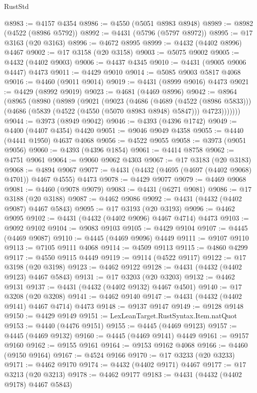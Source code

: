 \begin{lexlean}{RustStd}
\begin{coremodule}
@8983 := @4157 @4354
@8986 := @4550 (@5051 @8983 @8948)
@8989 := @8982 (@4522 (@8986 @5792))
@8992 := @4431 (@5796 (@5797 @8972))
@8995 := @17 @3163 (@20 @3163)
@8996 := @4672 @8995
@8999 := @4432 (@4402 @8996) @4467
@9002 := @17 @3158 (@20 @3158)
@9003 := @5075 @9002
@9005 := @4432 (@4402 @9003)
@9006 := @4437 @4345
@9010 := @4431 (@9005 @9006 @4447) @4473
@9011 := @4429 @9010
@9014 := @5085 @9003 @5817 @4068
@9016 := @4460 (@9011 @9014)
@9019 := @4431 (@8999 @9016) @4473
@9021 := @4429 (@8992 @9019)
@9023 := @4681 (@4469 @8996)
@9042 := @8964
    (@8965
      (@8980
        (@8989
          (@9021
            (@9023
              (@4686
                (@4689 (@4522 (@8986 @5833)))
                (@4686 (@5839 (@4522 (@4550 (@5070 @8983 @8948) @5847))) @4723)))))))
@9044 := @3973 (@8949 @9042)
@9046 := @4393 (@4396 @1742)
@9049 := @4400 (@4407 @4354) @4420
@9051 := @9046 @9049 @4358
@9055 := @4440 (@4441 @1950) @4637 @4068
@9056 := @4522 @9055
@9058 := @3973 (@9051 @9056)
@9060 := @4393 (@4396 @1854)
@9061 := @4414 @8758
@9062 := @4751 @9061
@9064 := @9060 @9062 @4303
@9067 := @17 @3183 (@20 @3183)
@9068 := @4894 @9067
@9077 := @4431 (@4432 (@4695 (@4697 (@4402 @9068) @4701)) @4467 @4555) @4473
@9078 := @4429 @9077
@9079 := @4469 @9068
@9081 := @4460 (@9078 @9079)
@9083 := @4431 (@6271 @9081)
@9086 := @17 @3188 (@20 @3188)
@9087 := @4462 @9086
@9092 := @4431 (@4432 (@4402 @9087) @4467 @5843)
@9095 := @17 @3193 (@20 @3193)
@9096 := @4462 @9095
@9102 := @4431 (@4432 (@4402 @9096) @4467 @4714) @4473
@9103 := @9092 @9102
@9104 := @9083 @9103
@9105 := @4429 @9104
@9107 := @4445 (@4469 @9087)
@9110 := @4445 (@4469 @9096) @4449
@9111 := @9107 @9110
@9113 := @7105 @9111 @4068
@9114 := @4509 @9113
@9115 := @4860 @4299
@9117 := @4550 @9115 @4449
@9119 := @9114 (@4522 @9117)
@9122 := @17 @3198 (@20 @3198)
@9123 := @4462 @9122
@9128 := @4431 (@4432 (@4402 @9123) @4467 @5843)
@9131 := @17 @3203 (@20 @3203)
@9132 := @4462 @9131
@9137 := @4431 (@4432 (@4402 @9132) @4467 @4501)
@9140 := @17 @3208 (@20 @3208)
@9141 := @4462 @9140
@9147 := @4431 (@4432 (@4402 @9141) @4467 @4714) @4473
@9148 := @9137 @9147
@9149 := @9128 @9148
@9150 := @4429 @9149
@9151 := LexLeanTarget.RustSyntax.Item.natQuot
@9153 := @4440 (@4476 @9151)
@9155 := @4445 (@4469 @9123)
@9157 := @4445 (@4469 @9132)
@9160 := @4445 (@4469 @9141) @4449
@9161 := @9157 @9160
@9162 := @9155 @9161
@9164 := @9153 @9162 @4068
@9166 := @4460 (@9150 @9164)
@9167 := @4524 @9166
@9170 := @17 @3233 (@20 @3233)
@9171 := @4462 @9170
@9174 := @4432 (@4402 @9171) @4467
@9177 := @17 @3213 (@20 @3213)
@9178 := @4462 @9177
@9183 := @4431 (@4432 (@4402 @9178) @4467 @5843)

\end{coremodule}
\end{lexlean}
